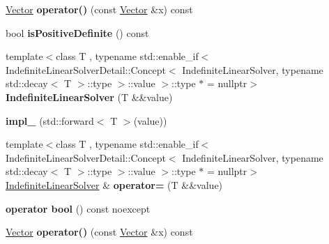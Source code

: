 \begin{DoxyCompactItemize}
\item 
\hypertarget{classSpacy_1_1IndefiniteLinearSolver_a150a854c97a44c1c53c4aa071e1b8b12}{\hyperlink{classSpacy_1_1Vector}{\-Vector} {\bfseries operator()} (const \hyperlink{classSpacy_1_1Vector}{\-Vector} \&x) const }\label{classSpacy_1_1IndefiniteLinearSolver_a150a854c97a44c1c53c4aa071e1b8b12}

\item 
\hypertarget{classSpacy_1_1IndefiniteLinearSolver_a04191e6ed2c8cd54870c79a919dcae39}{bool {\bfseries is\-Positive\-Definite} () const }\label{classSpacy_1_1IndefiniteLinearSolver_a04191e6ed2c8cd54870c79a919dcae39}

\item 
\hypertarget{classSpacy_1_1IndefiniteLinearSolver_af60b1bb12efcf0daccfb48122867ea96}{{\footnotesize template$<$class T , typename std\-::enable\-\_\-if$<$ Indefinite\-Linear\-Solver\-Detail\-::\-Concept$<$ Indefinite\-Linear\-Solver, typename std\-::decay$<$ T $>$\-::type $>$\-::value $>$\-::type $\ast$  = nullptr$>$ }\\{\bfseries \-Indefinite\-Linear\-Solver} (\-T \&\&value)}\label{classSpacy_1_1IndefiniteLinearSolver_af60b1bb12efcf0daccfb48122867ea96}

\item 
\hypertarget{classSpacy_1_1IndefiniteLinearSolver_a0f77940a36c6bcd65509a0cad183884b}{{\bfseries impl\-\_\-} (std\-::forward$<$ \-T $>$(value))}\label{classSpacy_1_1IndefiniteLinearSolver_a0f77940a36c6bcd65509a0cad183884b}

\item 
\hypertarget{classSpacy_1_1IndefiniteLinearSolver_a6ed5d50bdf25e31ea81a3aaa0c35dd8e}{{\footnotesize template$<$class T , typename std\-::enable\-\_\-if$<$ Indefinite\-Linear\-Solver\-Detail\-::\-Concept$<$ Indefinite\-Linear\-Solver, typename std\-::decay$<$ T $>$\-::type $>$\-::value $>$\-::type $\ast$  = nullptr$>$ }\\\hyperlink{classSpacy_1_1IndefiniteLinearSolver}{\-Indefinite\-Linear\-Solver} \& {\bfseries operator=} (\-T \&\&value)}\label{classSpacy_1_1IndefiniteLinearSolver_a6ed5d50bdf25e31ea81a3aaa0c35dd8e}

\item 
\hypertarget{classSpacy_1_1IndefiniteLinearSolver_a4ef57ec75c5f8cf611a99e80fe1a492d}{{\bfseries operator bool} () const noexcept}\label{classSpacy_1_1IndefiniteLinearSolver_a4ef57ec75c5f8cf611a99e80fe1a492d}

\item 
\hypertarget{classSpacy_1_1IndefiniteLinearSolver_a150a854c97a44c1c53c4aa071e1b8b12}{\hyperlink{classSpacy_1_1Vector}{\-Vector} {\bfseries operator()} (const \hyperlink{classSpacy_1_1Vector}{\-Vector} \&x) const }\label{classSpacy_1_1IndefiniteLinearSolver_a150a854c97a44c1c53c4aa071e1b8b12}


\end{DoxyCompactItemize}
